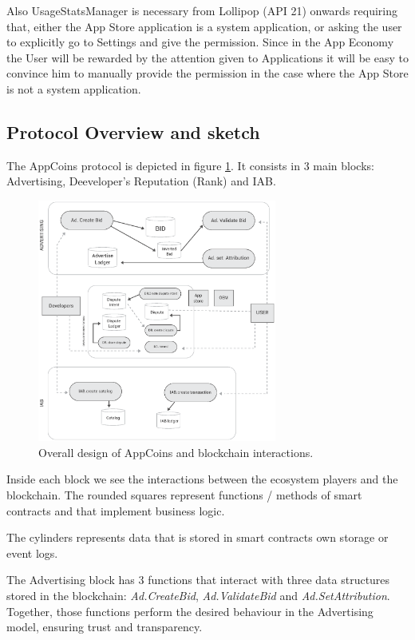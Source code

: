 Also UsageStatsManager is necessary from Lollipop (API 21) onwards requiring that, either the App Store application is a system application, or asking the user to explicitly go to Settings and give the permission. Since in the App Economy the User will be rewarded by the attention given to Applications it will be easy to convince him to manually provide the permission in the case where the App Store is not a system application.


\subsection{Protocol Overview and sketch}


The AppCoins protocol is depicted in figure \ref{fig:design}. It consists in 3 main blocks: Advertising, Deeveloper's Reputation (Rank) and IAB.

\begin{figure}[!ht]
\centering
\includegraphics[width=0.7\textwidth]{diagrams/design.eps}
\caption{Overall design of AppCoins and blockchain interactions.}
\label{fig:design}
\end{figure}


Inside each block we see the interactions between the ecosystem players and the blockchain. The rounded squares represent functions / methods of smart contracts and that implement business logic.

The cylinders represents data that is stored in smart contracts own storage or event logs.

\medskip

The Advertising block has 3 functions that interact with three data structures stored in the blockchain: {\em Ad.CreateBid},  {\em Ad.ValidateBid} and  {\em Ad.SetAttribution}. Together, those functions perform the desired behaviour in the Advertising model, ensuring trust and transparency.

